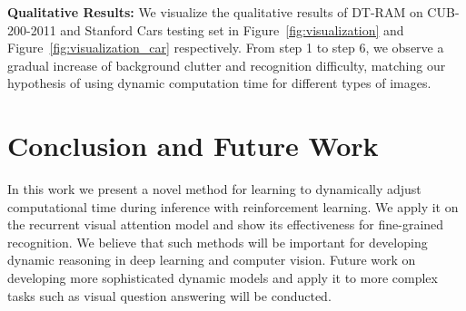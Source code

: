 \documentclass[10pt,twocolumn,letterpaper]{article}
\begin{document}


\textbf{Qualitative Results:} We visualize the qualitative results of DT-RAM on CUB-200-2011 and Stanford Cars testing set in Figure~\ref{fig:visualization} and Figure~\ref{fig:visualization_car} respectively.
From step 1 to step 6, we observe a gradual increase of background clutter and recognition difficulty, matching our hypothesis of using dynamic computation time for different types of images.


\section{Conclusion and Future Work}

In this work we present a novel method for learning to dynamically adjust computational time during inference with reinforcement learning.
We apply it on the recurrent visual attention model and show its effectiveness for fine-grained recognition.
We believe that such methods will be important for developing dynamic reasoning in deep learning and computer vision.
Future work on developing more sophisticated dynamic models and apply it to more complex tasks such as visual question answering will be conducted.

{\small


}
\end{document}

